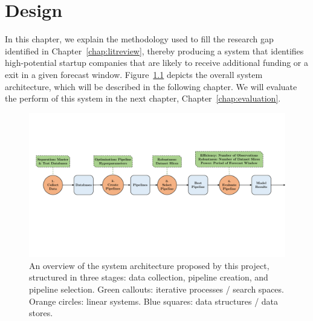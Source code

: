 \documentclass[../thesis/thesis.tex]{subfiles}
\begin{document}
\chapter{Design}
\label{chap:design}

In this chapter, we explain the methodology used to fill the research gap identified in Chapter~\ref{chap:litreview}, thereby producing a system that identifies high-potential startup companies that are likely to receive additional funding or a exit in a given forecast window. Figure~\ref{fig:design:system_architecture} depicts the overall system architecture, which will be described in the following chapter. We will evaluate the perform of this system in the next chapter, Chapter~\ref{chap:evaluation}.

\begin{figure}[!htb]
    \centering
    \includegraphics[width=\textwidth]{../figures/design/system_architecture}
    \caption[System architecture flowchart]{An overview of the system architecture proposed by this project, structured in three stages: data collection, pipeline creation, and pipeline selection. Green callouts: iterative processes / search spaces. Orange circles: linear systems. Blue squares: data structures / data stores.}
    \label{fig:design:system_architecture}
\end{figure}
\end{document}
